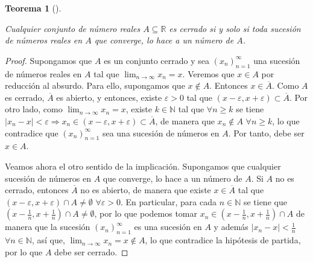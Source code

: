\documentclass[
  a4paper,
]{scrreport}
\theoremstyle{definition}
\theoremstyle{plain}
\theoremstyle{definition}
\theoremstyle{plain}
\newtheorem{theorem}{Teorema}[chapter]
\theoremstyle{plain}
\theoremstyle{remark}
\begin{document}
\leavevmode{}%
\begin{theorem}[]\label{thm-sucesiones-conjuntos-cerrados}

Cualquier conjunto de número reales \(A\subseteq\mathbb{R}\) es cerrado
si y solo si toda sucesión de números reales en \(A\) que converge, lo
hace a un número de \(A\).

\end{theorem}

\begin{tcolorbox}[enhanced jigsaw, breakable, arc=.35mm, colbacktitle=quarto-callout-note-color!10!white, toptitle=1mm, opacityback=0, colframe=quarto-callout-note-color-frame, colback=white, left=2mm, bottomrule=.15mm, opacitybacktitle=0.6, title=\textcolor{quarto-callout-note-color}{\faInfo}\hspace{0.5em}{Demostración}, toprule=.15mm, titlerule=0mm, coltitle=black, rightrule=.15mm, bottomtitle=1mm, leftrule=.75mm]

\begin{proof}

Supongamos que \(A\) es un conjunto cerrado y sea \((x_n)_{n=1}^\infty\)
una sucesión de números reales en \(A\) tal que
\(\lim_{n\to\infty} x_n=x\). Veremos que \(x\in A\) por reducción al
absurdo. Para ello, supongamos que \(x\not\in A\). Entonces
\(x\in \overline{A}\). Como \(A\) es cerrado, \(\overline{A}\) es
abierto, y entonces, existe \(\varepsilon>0\) tal que
\((x-\varepsilon,x+\varepsilon)\subset \overline{A}\). Por otro lado,
como \(\lim_{n\to\infty}x_n=x\), existe \(k\in\mathbb{N}\) tal que
\(\forall n\geq k\) se tiene
\(|x_n-x|<\varepsilon \Rightarrow x_n\in (x-\varepsilon,x+\varepsilon)\subset \overline{A}\),
de manera que \(x_n\not\in A\) \(\forall n\geq k\), lo que contradice
que \((x_n)_{n=1}^\infty\) sea una sucesión de números en \(A\). Por
tanto, debe ser \(x\in A\).

Veamos ahora el otro sentido de la implicación. Supongamos que cualquier
sucesión de números en \(A\) que converge, lo hace a un número de \(A\).
Si \(A\) no es cerrado, entonces \(\overline{A}\) no es abierto, de
manera que existe \(x\in\overline{A}\) tal que
\((x-\varepsilon,x+\varepsilon)\cap A\neq\emptyset\)
\(\forall \varepsilon>0\). En particular, para cada \(n\in\mathbb{N}\)
se tiene que \((x-\frac{1}{n},x+\frac{1}{n})\cap A\neq \emptyset\), por
lo que podemos tomar \(x_n\in (x-\frac{1}{n},x+\frac{1}{n})\cap A\) de
manera que la sucesión \((x_n)_{n=1}^\infty\) es una sucesión en \(A\) y
además \(|x_n-x|<\frac{1}{n}\) \(\forall n\in\mathbb{N}\), así que,
\(\lim_{n\to\infty}x_n=x\not\in A\), lo que contradice la hipótesis de
partida, por lo que \(A\) debe ser cerrado.

\end{proof}

\end{tcolorbox}
\end{document}
